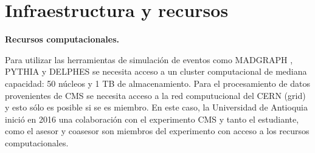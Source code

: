 \section{Infraestructura y recursos}

\textbf{Recursos computacionales.}

Para utilizar las herramientas de simulación de eventos como MADGRAPH \cite{Alwall:2014hca}, PYTHIA \cite{Sjostrand:2014zea} y DELPHES \cite{deFavereau:2013fsa} se necesita acceso a un cluster computacional de mediana capacidad: 50 núcleos y 1 TB de almacenamiento. Para el procesamiento de datos provenientes de CMS se necesita acceso a la red computucional del CERN (grid) y esto sólo es posible si se es miembro. En este caso, la Universidad de Antioquia inició en 2016 una colaboración con el experimento CMS y tanto el estudiante, como el asesor y coasesor son miembros del experimento con acceso a los recursos computacionales.

\newpage






